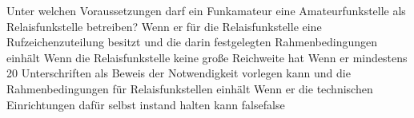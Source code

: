     {Unter welchen Voraussetzungen darf ein Funkamateur eine Amateurfunkstelle als Relaisfunkstelle betreiben?}
    {Wenn er für die Relaisfunkstelle eine Rufzeichenzuteilung besitzt und die darin festgelegten Rahmenbedingungen einhält}
    {Wenn die Relaisfunkstelle keine große Reichweite hat}
    {Wenn er mindestens 20 Unterschriften als Beweis der Notwendigkeit vorlegen kann und die Rahmenbedingungen für Relaisfunkstellen einhält}
    {Wenn er die technischen Einrichtungen dafür selbst instand halten kann}
    {false}{false}